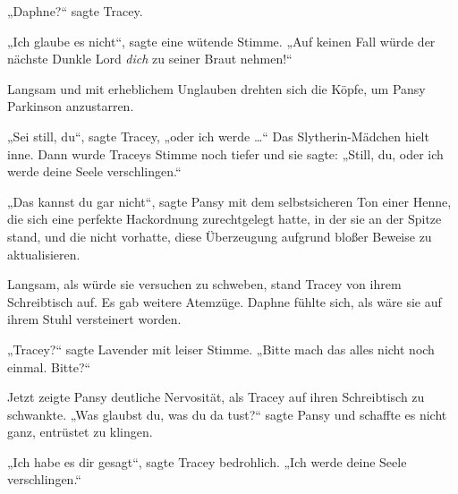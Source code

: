 „Daphne?“ sagte Tracey.

„Ich glaube es nicht“, sagte eine wütende Stimme.
„Auf keinen Fall würde der nächste Dunkle Lord \emph{dich} zu seiner Braut nehmen!“

Langsam und mit erheblichem Unglauben drehten sich die Köpfe, um Pansy Parkinson anzustarren.

„Sei still, du“, sagte Tracey, „oder ich werde …“ Das Slytherin-Mädchen hielt inne. Dann wurde Traceys Stimme noch tiefer und sie sagte:
„Still, du, oder ich werde deine Seele verschlingen.“

„Das kannst du gar nicht“, sagte Pansy mit dem selbstsicheren Ton einer Henne, die sich eine perfekte Hackordnung zurechtgelegt hatte, in der sie an der Spitze stand, und die nicht vorhatte, diese Überzeugung aufgrund bloßer Beweise zu aktualisieren.

Langsam, als würde sie versuchen zu schweben, stand Tracey von ihrem Schreibtisch auf. Es gab weitere Atemzüge. Daphne fühlte sich, als wäre sie auf ihrem Stuhl versteinert worden.

„Tracey?“ sagte Lavender mit leiser Stimme.
„Bitte mach das alles nicht noch einmal. Bitte?“

Jetzt zeigte Pansy deutliche Nervosität, als Tracey auf ihren Schreibtisch zu schwankte.
„Was glaubst du, was du da tust?“ sagte Pansy und schaffte es nicht ganz, entrüstet zu klingen.

„Ich habe es dir gesagt“, sagte Tracey bedrohlich.
„Ich werde deine Seele verschlingen.“

